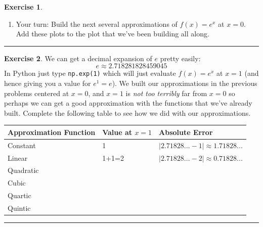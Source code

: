 \documentclass[
]{book}
\providecommand{\tightlist}{%
  \setlength{\itemsep}{0pt}\setlength{\parskip}{0pt}}
\theoremstyle{definition}
\theoremstyle{definition}
\theoremstyle{definition}
\newtheorem{exercise}{Exercise}[chapter]
\theoremstyle{remark}
\begin{document}
\begin{exercise}
\begin{enumerate}
  \begin{enumerate}
  \def\labelenumii{\roman{enumii}.}
  \tightlist
  \item
    Find the cubic approximation for \(f(x) = e^x\).
  \item
    How do we know that this function matches the first, second, and third derivatives of \(f(x)\) at \(x=0\)?
  \item
    Add your function function to the plot.
  \item
    Pause and think: What's the deal with the \(3!\) on the cubic term?\\
  \end{enumerate}
\item
  Your turn: Build the next several approximations of \(f(x) = e^x\) at \(x=0\). Add these plots to the plot that we've been building all along.
\end{enumerate}
\end{exercise}

\begin{center}\rule{0.5\linewidth}{0.5pt}\end{center}

\begin{exercise}
\protect\hypertarget{exr:unnamed-chunk-34}{}{\label{exr:unnamed-chunk-34} }We can get a decimal expansion of \(e\) pretty easily:
\[ e \approx 2.718281828459045 \]
In Python just type \texttt{np.exp(1)} which will just evaluate \(f(x) = e^x\) at \(x=1\) (and hence giving you a value for \(e^1 = e\)). We built our approximations in the previous problems centered at \(x=0\), and \(x=1\) is \emph{not too terribly} far from \(x=0\) so perhaps we can get a good approximation with the functions that we've already built. Complete the following table to see how we did with our approximations.

\begin{longtable}[]{@{}lll@{}}
\toprule
Approximation Function & Value at \(x=1\) & Absolute Error\tabularnewline
\midrule
\endhead
Constant & 1 & \(| 2.71828... - 1| \approx 1.71828...\)\tabularnewline
Linear & 1+1=2 & \(|2.71828... - 2| \approx 0.71828...\)\tabularnewline
Quadratic & &\tabularnewline
Cubic & &\tabularnewline
Quartic & &\tabularnewline
Quintic & &\tabularnewline
\bottomrule
\end{longtable}
\end{exercise}

\begin{center}\rule{0.5\linewidth}{0.5pt}\end{center}
\end{document}
